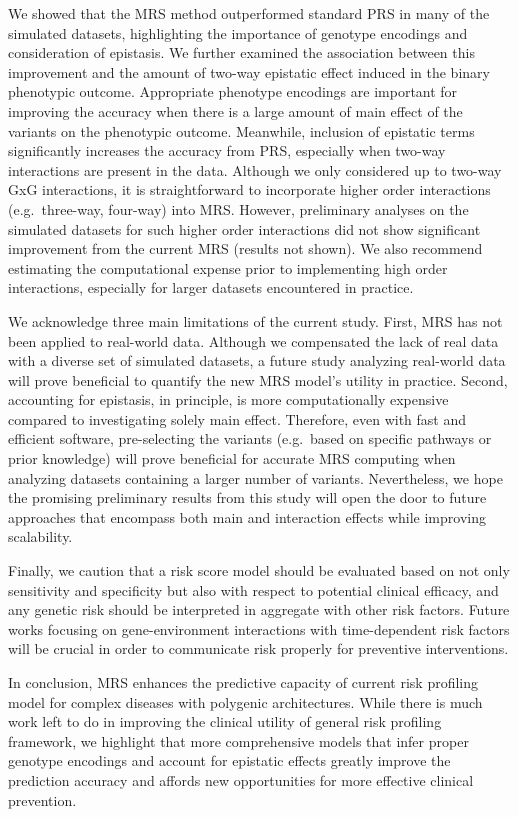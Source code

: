\documentclass[a4paper,twoside, 9pt]{article}
\begin{document}
We showed that the MRS method outperformed standard PRS in many of the
simulated datasets, highlighting the importance of genotype encodings
and consideration of epistasis. We further examined the association
between this improvement and the amount of two-way epistatic effect
induced in the binary phenotypic outcome. Appropriate phenotype
encodings are important for improving the accuracy when there is a large
amount of main effect of the variants on the phenotypic outcome.
Meanwhile, inclusion of epistatic terms significantly increases the
accuracy from PRS, especially when two-way interactions are present in
the data. Although we only considered up to two-way GxG interactions, it
is straightforward to incorporate higher order interactions
(e.g.~three-way, four-way) into MRS. However, preliminary analyses on
the simulated datasets for such higher order interactions did not show
significant improvement from the current MRS (results not shown). We
also recommend estimating the computational expense prior to
implementing high order interactions, especially for larger datasets
encountered in practice.

We acknowledge three main limitations of the current study. First, MRS has not
been applied to real-world data. Although we compensated the lack of
real data with a diverse set of simulated datasets, a future study
analyzing real-world data will prove beneficial to quantify the new MRS
model's utility in practice. Second, accounting for epistasis, in
principle, is more computationally expensive compared to
investigating solely main effect. Therefore, even with fast and
efficient software, pre-selecting the variants (e.g.~based on specific
pathways or prior knowledge) will prove beneficial for accurate MRS
computing when analyzing datasets containing a larger number of
variants. Nevertheless, we hope the promising preliminary results from
this study will open the door to future approaches that encompass both
main and interaction effects while improving scalability.

Finally, we caution that a risk score model should be evaluated based on
not only sensitivity and specificity but also with respect to potential
clinical efficacy, and any genetic risk should be interpreted in
aggregate with other risk factors. Future works focusing on
gene-environment interactions with time-dependent risk factors will be
crucial in order to communicate risk properly for preventive
interventions.

In conclusion, MRS enhances the predictive capacity of current risk
profiling model for complex diseases with polygenic architectures. While
there is much work left to do in improving the clinical
utility of general risk profiling framework, we highlight that more
comprehensive models that infer proper genotype encodings and account
for epistatic effects greatly improve the prediction accuracy and
affords new opportunities for more effective clinical prevention.
\end{document}
